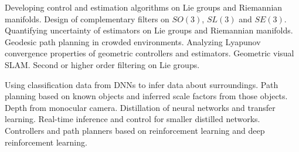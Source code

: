 

\begin{cvparagraph}
Developing control and estimation algorithms on Lie groups and Riemannian manifolds. Design of complementary filters on $SO(3)$, $SL(3)$ and $SE(3)$. Quantifying uncertainty of estimators on Lie groups and Riemannian manifolds. Geodesic path planning in crowded environments. Analyzing Lyapunov convergence properties of geometric controllers and estimators. Geometric visual SLAM. Second or higher order filtering on Lie groups. 
\end{cvparagraph}

\begin{cvparagraph}
Using classification data from DNNs to infer data about surroundings. Path planning based on known objects and inferred scale factors from those objects. Depth from monocular camera. Distillation of neural networks and transfer learning. Real-time inference and control for smaller distilled networks. Controllers and path planners based on reinforcement learning and deep reinforcement learning.
\end{cvparagraph}
